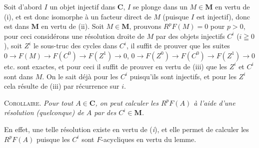 Soit d'abord $I$ un objet injectif dans $\mathbf C$, $I$ se plonge dans un
$M\in\mathbf M$ en vertu de (i), et est donc isomorphe à un facteur direct de
$M$ (puisque $I$ est injectif), donc est dans $\mathbf M$ en vertu de (ii).
Soit $M\in\mathbf M$, prouvons $R^pF(M)=0$ pour $p>0$, pour ceci considérons
une résolution droite de $M$ par des objets injectifs $C^i$ ($i\geqq0$), soit
$Z^i$ le sous-truc des cycles dans $C^i$, il suffit de prouver que les suites
$0\to F(M)\to F(C^0)\to F(Z^1)\to0$,
$0\to F(Z^0)\to F(C^0)\to F(Z^1)\to0$ etc.
sont exactes, et pour ceci il suffit de prouver en vertu de (iii) que les
$Z^i$ et $C^i$ sont dans $M$. On le sait déjà pour les $C^i$
puisqu'ils sont injectifs, et pour les $Z^i$ cela résulte de (iii) par
récurrence sur $i$.

\indent\textsc{Corollaire.} \textit{Pour tout $A\in \mathbf C$, on peut calculer les
$R^pF(A)$ à l'aide d'une résolution \textup{(}quelconque\textup{)} de $A$ par des
$C^i\in\mathbf M$.}

En effet, une telle résolution existe en vertu de (\textit{i}), et elle permet de
calculer les $R^pF(A)$ puisque les $C^i$ sont $F$-acycliques en vertu du
lemme.


